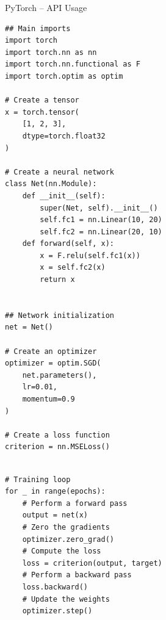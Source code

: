 \documentclass[presentation, 9pt]{beamer}\mode<presentation>{\usetheme{AMSBolognaFC}}
\begin{document}
\begin{frame}[fragile]{PyTorch -- API Usage}
\begin{multicols}{2}
\begin{verbatim}
## Main imports
import torch
import torch.nn as nn
import torch.nn.functional as F
import torch.optim as optim

# Create a tensor
x = torch.tensor(
	[1, 2, 3], 
	dtype=torch.float32
)

# Create a neural network
class Net(nn.Module):
	def __init__(self):
		super(Net, self).__init__()
		self.fc1 = nn.Linear(10, 20)
		self.fc2 = nn.Linear(20, 10)
	def forward(self, x):
		x = F.relu(self.fc1(x))
		x = self.fc2(x)
		return x


## Network initialization
net = Net()

# Create an optimizer
optimizer = optim.SGD(
	net.parameters(), 
	lr=0.01, 
	momentum=0.9
)

# Create a loss function
criterion = nn.MSELoss()
\end{verbatim}

\begin{verbatim}

# Training loop
for _ in range(epochs):
	# Perform a forward pass
	output = net(x)
	# Zero the gradients
	optimizer.zero_grad()
	# Compute the loss
	loss = criterion(output, target)
	# Perform a backward pass
	loss.backward()
	# Update the weights
	optimizer.step()

\end{verbatim}
\end{multicols}
\end{frame}
\end{document}
